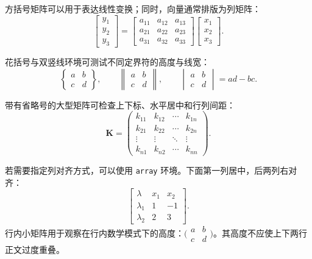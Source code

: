 方括号矩阵可以用于表达线性变换；同时，向量通常排版为列矩阵：
\begin{equation}
  \label{eq:test-bmatrix}
  \begin{bmatrix}
    y_1\\y_2\\y_3
  \end{bmatrix}
  =
  \begin{bmatrix}
    a_{11}&a_{12}&a_{13}\\
    a_{21}&a_{22}&a_{23}\\
    a_{31}&a_{32}&a_{33}
  \end{bmatrix}
  \begin{bmatrix}
    x_1\\x_2\\x_3
  \end{bmatrix}.
\end{equation}

花括号与双竖线环境可测试不同定界符的高度与线宽：
\begin{equation}
  \label{eq:test-brace-matrix}
  \begin{Bmatrix}
    a&b\\c&d
  \end{Bmatrix},\qquad
  \begin{Vmatrix}
    a&b\\c&d
  \end{Vmatrix},\qquad
  \begin{vmatrix}
    a&b\\c&d
  \end{vmatrix}=ad-bc.
\end{equation}

带有省略号的大型矩阵可检查上下标、水平居中和行列间距：
\begin{equation}
  \label{eq:test-large-matrix}
  \boldsymbol{K}=
  \begin{pmatrix}
    k_{11} & k_{12} & \cdots & k_{1n}\\
    k_{21} & k_{22} & \cdots & k_{2n}\\
    \vdots & \vdots & \ddots & \vdots\\
    k_{n1} & k_{n2} & \cdots & k_{nn}
  \end{pmatrix}.
\end{equation}

若需要指定列对齐方式，可以使用 \texttt{array} 环境。下面第一列居中，后两列右对齐：
\begin{equation}
  \label{eq:test-array}
  \left[
  \begin{array}{c|rr}
    \lambda & x_1 & x_2\\ \hline
    \lambda_1 & 1 & -1\\
    \lambda_2 & 2 & 3
  \end{array}
  \right].
\end{equation}
行内小矩阵用于观察在行内数学模式下的高度：$\bigl(\begin{smallmatrix}a&b\\c&d\end{smallmatrix}\bigr)$。其高度不应使上下两行正文过度重叠。

